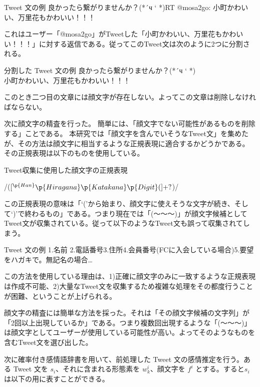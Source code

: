 \documentclass[11pt,a4j]{jsarticle}
\begin{document}
\begin{itembox}{Tweet 文の例}
    良かったら繋がりませんか？(*´ч ` *)RT @mosa2go: 小町かわいい、万里花もかわいい！！！
  \end{itembox}

  これはユーザー「@mosa2go」がTweetした「小町かわいい、万里花もかわいい！！！」に対する返信である。従ってこのTweet文は次のように2つに分割される。

  \begin{itembox}{分割した Tweet 文の例}
    良かったら繋がりませんか？(*´ч ` *) \\
    小町かわいい、万里花もかわいい！！！
  \end{itembox}

  このとき二つ目の文章には顔文字が存在しない。よってこの文章は削除しなければならない。

  次に顔文字の精査を行った。
  簡単には、「顔文字でない可能性があるものを削除する」ことである。
  本研究では「顔文字を含んでいそうなTweet文」を集めたが、その方法は顔文字に相当するような正規表現に適合するかどうかである。
  その正規表現は以下のものを使用している。
  \begin{itembox}{Tweet収集に使用した顔文字の正規表現}
      \begin{verbatim*}
/(\([^\p{Han}\p{Hiragana}\p{Katakana}\p{Digit}(]+?\))/
      \end{verbatim*}
  \end{itembox}
  
  この正規表現の意味は「`('から始まり、顔文字に使えそうな文字が続き、そして`)'で終わるもの」である。つまり現在では「(～～～)」が顔文字候補としてTweet文が収集されている。従って以下のようなTweet文も誤って収集されてしまう。
  \begin{itembox}{Tweet 文の例}
  1.名前 2.電話番号3.住所4.会員番号(FCに入会している場合)5.要望をハガキで。無記名の場合…
  \end{itembox}

  この方法を使用している理由は、1)正確に顔文字のみに一致するような正規表現は作成不可能、2)大量なTweet文を収集するため複雑な処理をその都度行うことが困難、ということが上げられる。

  顔文字の精査には簡単な方法を採った。それは「その顔文字候補の文字列」が「2回以上出現しているか」である。つまり複数回出現するような「(～～～)」は顔文字としてユーザーが使用している可能性が高い。よってそのようなものを含むTweet文を選び出した。

  
  次に確率付き感情語辞書を用いて、前処理した Tweet 文の感情推定を行う。ある Tweet 文を $s_i$、それに含まれる形態素を $w^i_k$、顔文字を $f^i$ とする。すると$s_i$は以下の用に表すことができる。
\end{document}
